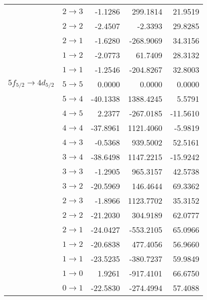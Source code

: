 \begin{longtable}{cc|rrr}
 & $2 \rightarrow 3$ &-1.1286&299.1814&21.9519\\
 & $2 \rightarrow 2$ &-2.4507&-2.3393&29.8285\\
 & $2 \rightarrow 1$ &-1.6280&-268.9069&34.3156\\
 & $1 \rightarrow 2$ &-2.0773&61.7409&28.3132\\
 & $1 \rightarrow 1$ &-1.2546&-204.8267&32.8003\\[4pt]
$5f_{5/2} \rightarrow 4d_{5/2}$ & $5 \rightarrow 5$ &0.0000&0.0000&0.0000\\
 & $5 \rightarrow 4$ &-40.1338&1388.4245&5.5791\\
 & $4 \rightarrow 5$ &2.2377&-267.0185&-11.5610\\
 & $4 \rightarrow 4$ &-37.8961&1121.4060&-5.9819\\
 & $4 \rightarrow 3$ &-0.5368&939.5002&52.5161\\
 & $3 \rightarrow 4$ &-38.6498&1147.2215&-15.9242\\
 & $3 \rightarrow 3$ &-1.2905&965.3157&42.5738\\
 & $3 \rightarrow 2$ &-20.5969&146.4644&69.3362\\
 & $2 \rightarrow 3$ &-1.8966&1123.7702&35.3152\\
 & $2 \rightarrow 2$ &-21.2030&304.9189&62.0777\\
 & $2 \rightarrow 1$ &-24.0427&-553.2105&65.0966\\
 & $1 \rightarrow 2$ &-20.6838&477.4056&56.9660\\
 & $1 \rightarrow 1$ &-23.5235&-380.7237&59.9849\\
 & $1 \rightarrow 0$ &1.9261&-917.4101&66.6750\\
 & $0 \rightarrow 1$ &-22.5830&-274.4994&57.4088
\end{longtable}
%


